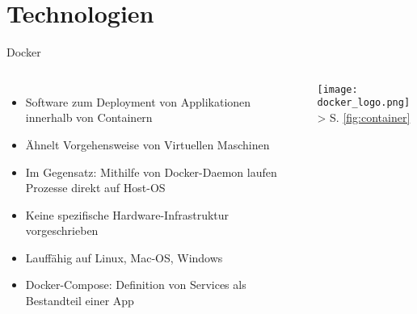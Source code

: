 \documentclass[compress]{beamer}
\begin{document}

\section{Technologien}
\begin{frame}{Docker}
  \begin{columns}[c]
    \begin{itemize}
      \item Software zum Deployment von Applikationen innerhalb von Containern
      \item Ähnelt Vorgehensweise von Virtuellen Maschinen
      \item Im Gegensatz: Mithilfe von Docker-\break Daemon laufen Prozesse direkt auf Host-OS
      \item Keine spezifische Hardware-\break Infrastruktur vorgeschrieben
      \item Lauffähig auf Linux, Mac-OS, Windows
      \item Docker-Compose: Definition von Services als Bestandteil einer App
    \end{itemize}
    \texttt{[image: docker\_logo.png]}\\
    \label{fig:docker}
    \hspace*{0.1cm} {\tiny > S. \ref{fig:container}}
  \end{columns}
\end{frame}
\end{document}
